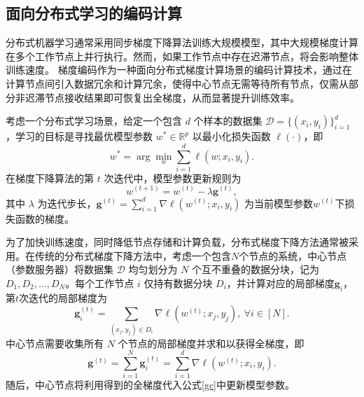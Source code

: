 \subsection{面向分布式学习的编码计算}

分布式机器学习通常采用同步梯度下降算法训练大规模模型，其中大规模梯度计算在多个工作节点上并行执行。然而，如果工作节点中存在迟滞节点，将会影响整体训练速度。
梯度编码作为一种面向分布式梯度计算场景的编码计算技术，通过在计算节点间引入数据冗余和计算冗余，使得中心节点无需等待所有节点，仅需从部分非迟滞节点接收结果即可恢复出全梯度，从而显著提升训练效率。

考虑一个分布式学习场景，给定一个包含 $d$ 个样本的数据集 $\mathcal{D} = \{(x_i, y_i)\}_{i=1}^d$，学习的目标是寻找最优模型参数 $w^* \in \mathbb{R}^p$ 以最小化损失函数 $\ell(\cdot)$，即
\begin{equation}
	w^* = \arg \min_{w} \sum_{i=1}^d \ell(w; x_i, y_i).
\end{equation}
在梯度下降算法的第 $t$ 次迭代中，模型参数更新规则为
\begin{equation}
	w^{(t+1)} = w^{(t)} - \lambda \mathbf{g}^{(t)},\label{gc}
\end{equation}
其中 $\lambda$ 为迭代步长，$\mathbf{g}^{(t)}= \sum_{i=1}^d \nabla \ell(w^{(t)}; x_i, y_i)$ 为当前模型参数$w^{(t)}$下损失函数的梯度。

为了加快训练速度，同时降低节点存储和计算负载，分布式梯度下降方法通常被采用。在传统的分布式梯度下降方法中，考虑一个包含$N$个节点的系统，中心节点（参数服务器）将数据集 $\mathcal{D}$ 均匀划分为 $N$ 个互不重叠的数据分块，记为 $D_1, D_2, \dots, D_N$。每个工作节点 $i$ 仅持有数据分块 $D_i$，并计算对应的局部梯度$\mathbf{g}_i$，第$t$次迭代的局部梯度为
\begin{equation}
	\mathbf{g}_i^{(t)} = \sum_{(x_j,y_j) \in D_i} \nabla \ell(w^{(t)}; x_j, y_j),~\forall i\in[N].
\end{equation}
 中心节点需要收集所有 $N$ 个节点的局部梯度并求和以获得全梯度，即
 \begin{equation}
 	\mathbf{g}^{(t)} = \sum_{i=1}^N \mathbf{g}_i^{(t)}=\sum_{i=1}^d \nabla \ell(w^{(t)}; x_i, y_i).
 \end{equation}
 随后，中心节点将利用得到的全梯度代入公式\eqref{gc}中更新模型参数。

